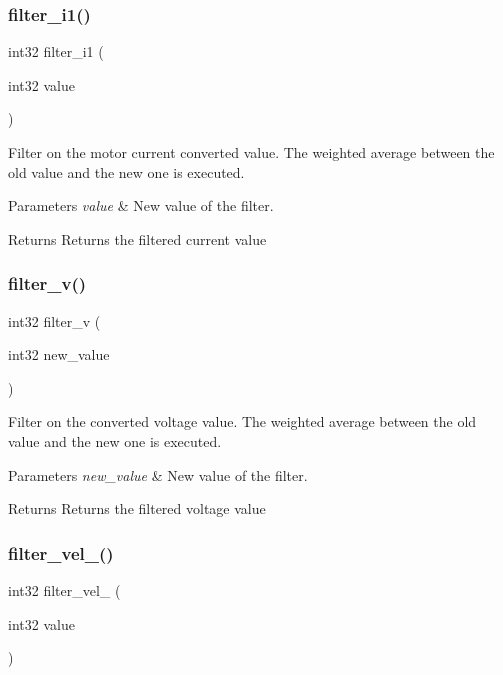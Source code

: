 \subsubsection{filter\+\_\+i1()}
{\footnotesize\ttfamily int32 filter\+\_\+i1 (\begin{DoxyParamCaption}\item[{int32}]{value }\end{DoxyParamCaption})}

Filter on the motor current converted value. The weighted average between the old value and the new one is executed.


\begin{DoxyParams}{Parameters}
{\em value} & New value of the filter.\\
\hline
\end{DoxyParams}
\begin{DoxyReturn}{Returns}
Returns the filtered current value 
\end{DoxyReturn}
\mbox{\label{utils_8h_af034fe9aa479d4adfc6e75e20b2f7ff3}} 
\subsubsection{filter\+\_\+v()}
{\footnotesize\ttfamily int32 filter\+\_\+v (\begin{DoxyParamCaption}\item[{int32}]{new\+\_\+value }\end{DoxyParamCaption})}

Filter on the converted voltage value. The weighted average between the old value and the new one is executed.


\begin{DoxyParams}{Parameters}
{\em new\+\_\+value} & New value of the filter.\\
\hline
\end{DoxyParams}
\begin{DoxyReturn}{Returns}
Returns the filtered voltage value 
\end{DoxyReturn}
\mbox{\label{utils_8h_ad378840ee71c2d41d2d4f1a84465c7f3}} 
\subsubsection{filter\+\_\+vel\+\_()}
{\footnotesize\ttfamily int32 filter\+\_\+vel\+\_ (\begin{DoxyParamCaption}\item[{int32}]{value }\end{DoxyParamCaption})}

